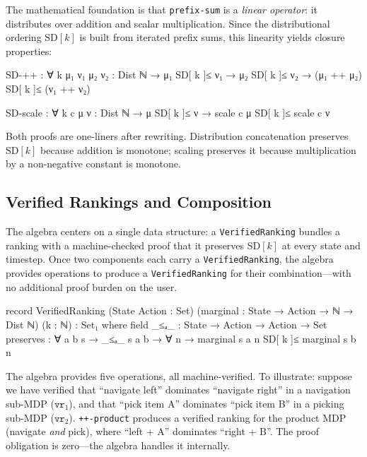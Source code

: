 \documentclass[9pt,a4paper]{article}
\theoremstyle{plain}
\theoremstyle{definition}
\theoremstyle{remark}
\begin{document}
The mathematical foundation is that \texttt{prefix-sum} is a \emph{linear operator}: it distributes over addition and scalar multiplication.  Since the distributional ordering SD$[k]$ is built from iterated prefix sums, this linearity yields closure properties:

\begin{spec}
  SD-++ : ∀ k {μ₁ ν₁ μ₂ ν₂ : Dist ℕ} →
    μ₁ SD[ k ]≤ ν₁ → μ₂ SD[ k ]≤ ν₂ →
    (μ₁ ++ μ₂) SD[ k ]≤ (ν₁ ++ ν₂)

  SD-scale : ∀ k c {μ ν : Dist ℕ} →
    μ SD[ k ]≤ ν → scale c μ SD[ k ]≤ scale c ν
\end{spec}

\noindent Both proofs are one-liners after rewriting.  Distribution concatenation preserves SD$[k]$ because addition is monotone; scaling preserves it because multiplication by a non-negative constant is monotone.

\subsection{Verified Rankings and Composition}

The algebra centers on a single data structure: a \texttt{VerifiedRanking} bundles a ranking with a machine-checked proof that it preserves SD$[k]$ at every state and timestep.  Once two components each carry a \texttt{VerifiedRanking}, the algebra provides operations to produce a \texttt{VerifiedRanking} for their combination---with no additional proof burden on the user.

\begin{spec}
  record VerifiedRanking
    (State Action : Set)
    (marginal : State → Action → ℕ → Dist ℕ)
    (k : ℕ) : Set₁ where
    field
      _≤ₐ_     : State → Action → Action → Set
      preserves : ∀ a b s → _≤ₐ_ s a b →
                  ∀ n → marginal s a n SD[ k ]≤ marginal s b n
\end{spec}

\noindent The algebra provides five operations, all machine-verified.  To illustrate: suppose we have verified that ``navigate left'' dominates ``navigate right'' in a navigation sub-MDP ($\texttt{vr}_1$), and that ``pick item A'' dominates ``pick item B'' in a picking sub-MDP ($\texttt{vr}_2$).  \texttt{++-product} produces a verified ranking for the product MDP (navigate \emph{and} pick), where ``left + A'' dominates ``right + B''.  The proof obligation is zero---the algebra handles it internally.
\end{document}
